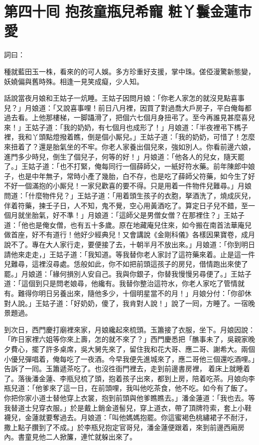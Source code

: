 
\chapter*{第四十囘 抱孩童瓶兒希寵 粧丫鬟金蓮市愛}


詞曰：

\begin{myquote}
種就藍田玉一株，看來的的可人娛。多方珍重好支援，掌中珠。傞俹漫驚新態變，妖嬈偏與舊時殊。相逢一見笑成癡，少人知。

\end{myquote}

話說當夜月娘和王姑子一炕睡。王姑子因問月娘：「你老人家怎的就沒見點喜事兒？」月娘道：「又說喜事哩！前日八月裡，因買了對過喬大戶房子，平白俺每都過去看。上他那樓梯，一脚躡滑了，把個六七個月身扭弔了。至今再誰見甚麼喜兒來！」王姑子道：「我的奶奶，有七個月也成形了！」月娘道：「半夜裡弔下榪子裡，我和丫頭點燈撥着瞧，倒是個小厮兒。」王姑子道：「我的奶奶，可惜了！怎麼來扭着了？還是胎氣坐的不牢。{}你老人家養出個兒來，強如別人。你看前邊六娘，進門多少時兒，倒生了個兒子，何等的好！」月娘道：「他各人的兒女，隨天罷了。」王姑子道：「也不打緊，俺每同行一個薛師父，一紙好符水藥。前年陳郎中娘子，也是中年無子，常時小產了幾胎，白不存，也是吃了薛師父符藥，如今生了好不好一個滿抱的小厮兒！一家兒歡喜的要不得。只是用着一件物件兒難尋。」月娘問道：「什麼物件兒？」王姑子道：「用着頭生孩子的衣胞，拏酒洗了，燒成灰兒，伴着符藥，揀壬子日，人不知，鬼不覺，空心用黃酒吃了。算定日子兒不錯，至一個月就坐胎氣，好不準！」月娘道：「這師父是男僧女僧？在那裡住？」王姑子道：「他也是俺女僧，也有五十多歲。原在地藏庵兒住來，如今搬在南首法華庵兒做首座，好不有道行！他好少經典兒！又會講說《金剛科儀》各樣因果寶卷，成月說不了。專在大人家行走，要便接了去，十朝半月不放出來。」月娘道：「你到明日請他來走走，」王姑子道：「我知道。等我替你老人家討了這符藥來着。止是這一件兒難尋，這裡沒尋處。恁般如此，你不如把前頭這孩子的房兒，借情跑出來使了罷。」月娘道：「緣何損別人安自己。我與你銀子，你替我慢慢另尋便了。」王姑子道：「這個到只是問老娘尋，他纔有。我替你整治這符水，你老人家吃了管情就有。難得你明日另養出來，隨他多少，十個明星當不的月！」月娘分付：「你卻休對人說。」王姑子道：「好奶奶，傻了，我肯對人說！」說了一囘，方睡了。一宿晚景題過。

到次日，西門慶打廟裡來家，月娘纔起來梳頭。玉簫接了衣服，坐下。月娘因說：「昨日家裡六姐等你來上壽，怎的就不來了？」西門慶悉把「醮事未了，吳親家晚夕費心，擺了許多桌席，吳大舅先來了，留住我和花大哥、應二哥、謝希大。兩個小優兒彈唱着，俺每吃了一夜酒。今早我便先進城來了，應二哥他三個還吃酒哩。」告訴了一囘。玉簫遞茶吃了。也沒徃衙門裡去，走到前邊書房裡，𢱉着床上就睡着了。落後潘金蓮、李瓶兒梳了頭，抱着孩子出來，都到上房，陪着吃茶。月娘向李瓶兒道：「他爹來了這一日，在前頭哩，我叫他吃茶食，他不吃。如今有了飯了。你把你家小道士替他穿上衣裳，抱到前頭與他爹瞧瞧去。」潘金蓮道：「我也去。等我替道士兒穿衣服。」{}於是戴上銷金道髻兒，穿上道衣，帶了頂牌符索，套上小鞋襪兒，金蓮就要奪過去。月娘道：「叫他媽媽抱罷。你這蜜褐色桃繡裙子不耐汙，撒上點子臢到了不成。」於李瓶兒抱定官哥兒，潘金蓮便跟着，來到前邊西廂房內。書童見他二人掀簾，連忙就躲出來了。

